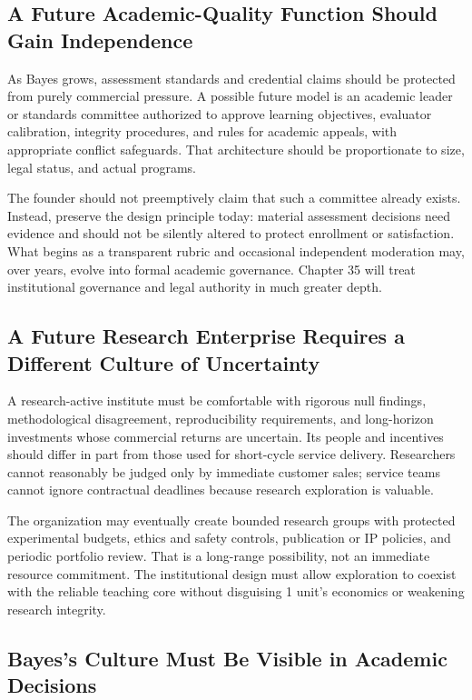 \subsection{A Future Academic-Quality Function Should Gain Independence}
\label{sec:bayes_future_academic_quality}

As Bayes grows, assessment standards and credential claims should be protected from purely commercial pressure. A possible future model is an academic leader or standards committee authorized to approve learning objectives, evaluator calibration, integrity procedures, and rules for academic appeals, with appropriate conflict safeguards. That architecture should be proportionate to size, legal status, and actual programs.

The founder should not preemptively claim that such a committee already exists. Instead, preserve the design principle today: material assessment decisions need evidence and should not be silently altered to protect enrollment or satisfaction. What begins as a transparent rubric and occasional independent moderation may, over years, evolve into formal academic governance. Chapter 35 will treat institutional governance and legal authority in much greater depth.

\subsection{A Future Research Enterprise Requires a Different Culture of Uncertainty}
\label{sec:bayes_future_research_culture}

A research-active institute must be comfortable with rigorous null findings, methodological disagreement, reproducibility requirements, and long-horizon investments whose commercial returns are uncertain. Its people and incentives should differ in part from those used for short-cycle service delivery. Researchers cannot reasonably be judged only by immediate customer sales; service teams cannot ignore contractual deadlines because research exploration is valuable.

The organization may eventually create bounded research groups with protected experimental budgets, ethics and safety controls, publication or IP policies, and periodic portfolio review. That is a long-range possibility, not an immediate resource commitment. The institutional design must allow exploration to coexist with the reliable teaching core without disguising 1 unit's economics or weakening research integrity.

\subsection{Bayes's Culture Must Be Visible in Academic Decisions}
\label{sec:bayes_culture_visible_in_decisions}

